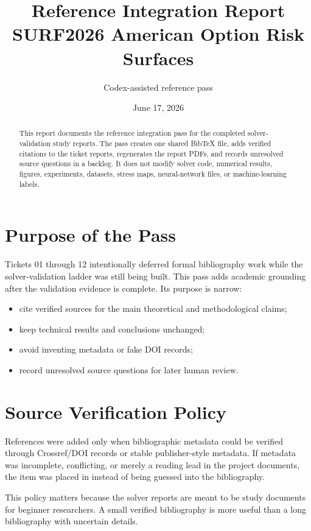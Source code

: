 \documentclass[11pt,a4paper]{article}
\title{\textbf{Reference Integration Report}\\
\large SURF2026 American Option Risk Surfaces}
\author{Codex-assisted reference pass}
\date{June 17, 2026}
\newcommand{\file}[1]{\path{#1}}
\begin{document}
\maketitle

\begin{abstract}
This report documents the reference integration pass for the completed solver-validation study
reports. The pass creates one shared BibTeX file, adds verified citations to the ticket reports,
regenerates the report PDFs, and records unresolved source questions in a backlog. It does not
modify solver code, numerical results, figures, experiments, datasets, stress maps, neural-network
files, or machine-learning labels.
\end{abstract}

\tableofcontents
\newpage

\section{Purpose of the Pass}

Tickets 01 through 12 intentionally deferred formal bibliography work while the solver-validation
ladder was still being built. This pass adds academic grounding after the validation evidence is
complete. Its purpose is narrow:
\begin{itemize}
  \item cite verified sources for the main theoretical and methodological claims;
  \item keep technical results and conclusions unchanged;
  \item avoid inventing metadata or fake DOI records;
  \item record unresolved source questions for later human review.
\end{itemize}

\section{Source Verification Policy}

References were added only when bibliographic metadata could be verified through Crossref/DOI
records or stable publisher-style metadata. If metadata was incomplete, conflicting, or merely a
reading lead in the project documents, the item was placed in \file{reference_backlog.md} instead
of being guessed into the bibliography.

This policy matters because the solver reports are meant to be study documents for beginner
researchers. A small verified bibliography is more useful than a long bibliography with uncertain
details.
\end{document}
